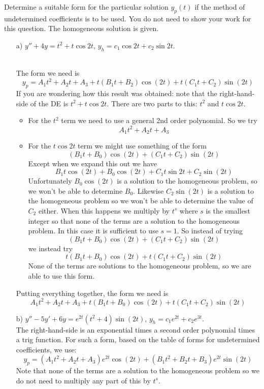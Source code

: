 \ifnum {}
\question[4] 
Determine a suitable form for the particular solution $y_p(t)$ if the method of undetermined coeﬃcients is to be used. You do not need to show your work for this question. The homogeneous solution is given. 
\begin{enumerate}
    \item[a)] $y''+4y = t^2+t\cos2t$, $y_h = c_1\cos 2t + c_2 \sin 2t$. 
    \ifnum {} {\color{DarkBlue} \\ The form we need is
    $$y_p = A_1t^2+A_2t+A_3 + t(B_1t+B_2)\cos(2t) + t(C_1t+C_2)\sin(2t)$$
    If you are wondering how this result was obtained: note that the right-hand-side of the DE is $t^2+t\cos2t$. There are two parts to this: $t^2$ and $t\cos2t$. 
    \begin{itemize}
        \item For the $t^2$ term we need to use a general 2nd order polynomial. So we try $$A_1t^2+A_2t+A_3$$ 
        \item For the $t\cos2t$ term we might use something of the form $$(B_1t+B_0)\cos(2t) + (C_1t+C_2)\sin(2t)$$ Except when we expand this out we have $$B_1t\cos(2t)+B_0\cos(2t) + C_1t\sin2t +C_2\sin(2t)$$ Unfortunately $B_0\cos(2t)$ is a solution to the homogeneous problem, so we won't be able to determine $B_0$. Likewise $C_2\sin(2t)$ is a solution to the homogeneous problem so we won't be able to determine the value of $C_2$ either. When this happens we multiply by $t^s$ where $s$ is the smallest integer so that none of the terms are a solution to the homogeneous problem. In this case it is sufficient to use $s=1$. So instead of trying 
        $$(B_1t+B_0)\cos(2t) + (C_1t+C_2)\sin(2t)$$ 
        we instead try
        $$t(B_1t+B_0)\cos(2t) + t(C_1t+C_2)\sin(2t)$$ 
        None of the terms are solutions to the homogeneous problem, so we are able to use this form. 
    \end{itemize}
    Putting everything together, the form we need is
    $$A_1t^2+A_2t+A_3 + t(B_1t+B_0)\cos(2t) + t (C_1t+C_2)\sin(2t)$$
    } 
    \else 
    \vspace{2cm}
    \fi
    \item[b)] $y'' - 5y' + 6y =  e^{2t} (t^2 + 4) \sin(2t)$, $y_h = c_1e^{2t} + c_2 e^{3t}$. 
    \ifnum {} {\color{DarkBlue} \\ The right-hand-side is an exponential times a second order polynomial times a trig function. For such a form, based on the table of forms for undetermined coefficients, we use:
    $$y_p = (A_1t^2+A_2t + A_3)e^{2t}\cos(2t) + (B_1t^2+B_2t + B_3)e^{2t}\sin(2t)$$
    Note that none of the terms are a solution to the homogeneous problem so we do not need to multiply any part of this by $t^s$.
    } 
    \else 
    \vspace{2cm}
    \fi        
\end{enumerate}
\fi


